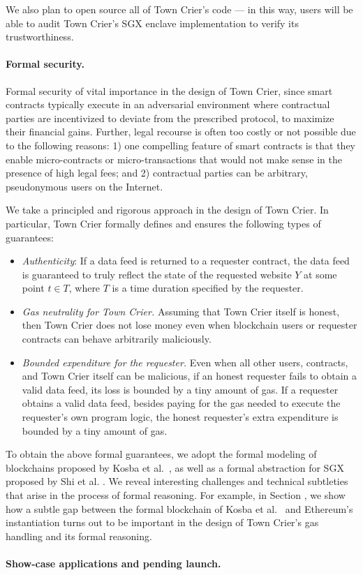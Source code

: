 We also plan to open source all of Town Crier's code --- in this way, 
users will be able to audit Town Crier's SGX enclave implementation
to verify its trustworthiness.


\paragraph{Formal security.}
Formal security of vital importance in the design of Town Crier, since
smart contracts  typically execute in an adversarial environment
where contractual parties are incentivized to 
deviate from the prescribed protocol, to maximize their financial gains.
Further, 
legal recourse is often too costly or 
not possible due to the following reasons:
1) one compelling feature of 
smart contracts is that they enable 
micro-contracts or micro-transactions that 
would not make sense in the presence of high legal fees;
and 2) contractual parties can be arbitrary, pseudonymous users on the Internet.

We take a principled and rigorous approach in the design of Town Crier. 
In particular, Town Crier formally defines and ensures  
the following types of guarantees:

\begin{itemize}[leftmargin=5mm]
\item
{\it Authenticity}: If a data feed is returned
to a requester contract, the data feed is guaranteed
to truly reflect the state of 
the requested website $Y$ 
at some point $t \in T$, where $T$ is a time duration specified 
by the requester.
\item
{\it Gas neutrality for Town Crier.} 
Assuming that Town Crier itself is honest, 
then Town Crier does not lose money   
even when blockchain users or requester contracts
can behave arbitrarily maliciously.
\item
{\it Bounded expenditure for the requester.} 
Even when all other users, contracts, and Town Crier itself 
can be malicious, 
if an honest requester  
fails to obtain a valid data feed, its loss is bounded by a tiny 
amount of gas.
If a requester obtains a valid data feed, besides paying for the gas
needed to execute the requester's own program logic, the honest requester's 
extra expenditure  
is bounded by a tiny amount of gas.
\end{itemize}

To obtain the above formal guarantees,
we adopt the formal modeling 
of blockchains proposed by Kosba et al.~\cite{hawk},
as well as a formal abstraction for SGX proposed by Shi et al. .
We reveal interesting challenges and technical subtleties
that arise in the process of formal reasoning.
For example, in Section , we show how 
a subtle gap between the formal blockchain
of Kosba et al.~\cite{hawk}
and Ethereum's instantiation  
turns out to be important in the design of Town Crier's
gas handling and its formal reasoning.  


\paragraph{Show-case applications and pending launch.}







